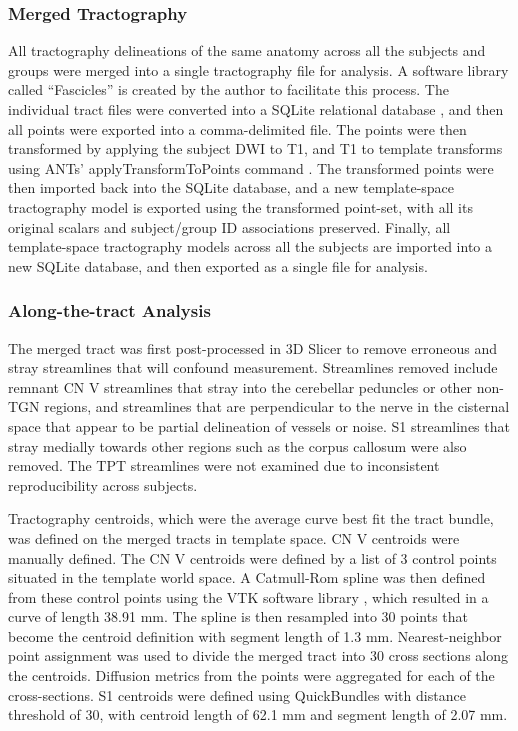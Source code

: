 \subsubsection{Merged Tractography}
All tractography delineations of the same anatomy across all the subjects and groups were merged into a single tractography file for analysis. A software library called “Fascicles” is created by the author to facilitate this process. The individual tract files were converted into a SQLite relational database \cite{owens2010sqlite}, and then all points were exported into a comma-delimited file. The points were then transformed by applying the subject DWI to T1, and T1 to template transforms using ANTs’  applyTransformToPoints command \cite{Avants2009}. The transformed points were then imported back into the SQLite database, and a new template-space tractography model is exported using the transformed point-set, with all its original scalars and subject/group ID associations preserved. Finally, all template-space tractography models across all the subjects are imported into a new SQLite database, and then exported as a single file for analysis. 

\subsubsection{Along-the-tract Analysis}
The merged tract was first post-processed in 3D Slicer to remove erroneous and stray streamlines that will confound measurement. Streamlines removed include remnant CN V streamlines that stray into the cerebellar peduncles or other non-TGN regions, and streamlines that are perpendicular to the nerve in the cisternal space that appear to be partial delineation of vessels or noise. S1 streamlines that stray medially towards other regions such as the corpus callosum were also removed. The TPT streamlines were not examined due to inconsistent reproducibility across subjects. 

Tractography centroids, which were the average curve best fit the tract bundle, was defined on the merged tracts in template space. CN V centroids were manually defined. The CN V centroids were defined by a list of 3 control points situated in the template world space. A Catmull-Rom spline \cite{DeRose1988} was then defined from these control points using the VTK software library \cite{Schroeder2005}, which resulted in a curve of length 38.91 mm. The spline is then resampled into 30 points that become the centroid definition with segment length of 1.3 mm. Nearest-neighbor point assignment was used to divide the merged tract into 30 cross sections along the centroids. Diffusion metrics from the points were aggregated for each of the cross-sections.  S1 centroids were defined using QuickBundles \cite{Garyfallidis2012} with distance threshold of 30, with centroid length of 62.1 mm and segment length of 2.07 mm. 


